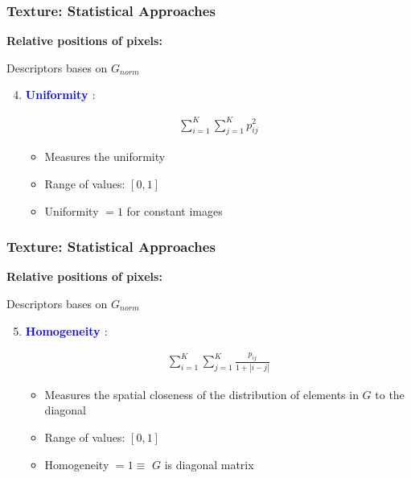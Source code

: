 \documentclass[english,11pt,table,handout]{beamer}
\begin{document}
\frame
{
	\frametitle{Texture: Statistical Approaches}
	\large
	\textbf{Relative positions of pixels: }
	\newline
	\begin{block}{Descriptors bases on $G_{norm}$}
		\begin{enumerate}
			\setcounter{enumi}{3}
			\item \textbf{\textcolor{blue}{Uniformity } }:
			
			\begin{equation}
			\begin{split}
			\nonumber
			\sum_{i=1}^{K}{ \sum_{j=1}^{K} { p_{ij}^2 } }
			\end{split}
			\end{equation}
			
			\begin{itemize}
				\item Measures the uniformity
				\item Range of values: $[0, 1]$
				\item Uniformity $= 1$ for constant images
				
			\end{itemize}
			
		\end{enumerate}
		
	\end{block}
}

\frame
{
	\frametitle{Texture: Statistical Approaches}
	\large
	\textbf{Relative positions of pixels: }
	\newline
	\begin{block}{Descriptors bases on $G_{norm}$}
		\begin{enumerate}
			\setcounter{enumi}{4}
			\item \textbf{\textcolor{blue}{Homogeneity } }:
			
			\begin{equation}
			\begin{split}
			\nonumber
			\sum_{i=1}^{K}{ \sum_{j=1}^{K} { \frac{p_{ij}}{ 1 + |i - j|}  } }
			\end{split}
			\end{equation}
			
			\begin{itemize}
				\item Measures the spatial closeness of the distribution of elements in $G$ to the diagonal 
				\item Range of values: $[0, 1]$
				\item Homogeneity $= 1  \equiv $ $G$ is diagonal matrix
				
			\end{itemize}
			
		\end{enumerate}
		
	\end{block}
}
\end{document}
